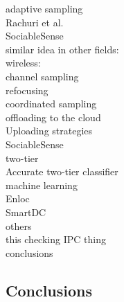 adaptive sampling\\
	Rachuri et al. \cite{rachuri:dynamicsensing}\\
	SociableSense \cite{rachuri:socialsense} \\
	similar idea in other fields:\\
		wireless:\\
			channel sampling \cite{deshpande:channeling}\\
			refocusing \cite{deshpande:refocusing}\\
			coordinated sampling \cite{deshpande:coordinated}\\

offloading to the cloud\\
	Uploading strategies \cite{musolesi:offloading}\\
	SociableSense \cite{rachuri:socialsense} \\
	
two-tier\\
	Accurate two-tier classifier \cite{srinivasan:twotier}\\

machine learning\\
	Enloc \cite{constandache:enloc}\\
	SmartDC \cite{chon:smartdc}\\

others\\
	this checking IPC thing\\

conclusions

\subsection{Conclusions}
